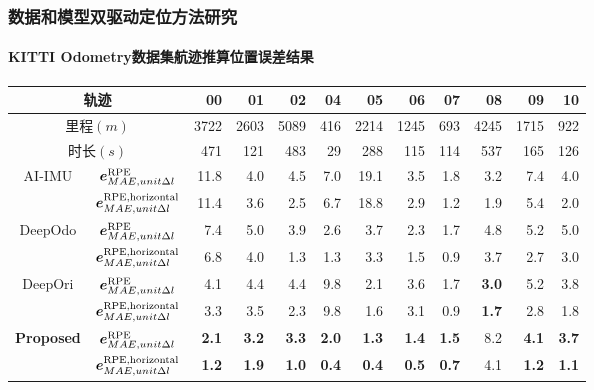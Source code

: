 \begin{frame} 
 	\frametitle{数据和模型双驱动定位方法研究}
 	\framesubtitle{KITTI Odometry数据集航迹推算位置误差结果}
    {\footnotesize
    \setlength{\tabcolsep}{2pt}
		\begin{tabular*}{\linewidth}{@{\extracolsep{\fill}}ccrrrrrrrrrr}
			\toprule
            \multicolumn{2}{c}{轨迹} & 00 & 01 & 02 & 04 & 05 & 06 & 07 & 08 & 09 & 10 \\
			\midrule
			\multicolumn{2}{c}{里程$\left(\unit{m}\right)$} & 3722 & 2603 & 5089 & 416 & 2214 & 1245 & 693 & 4245 & 1715 & 922 \\
			\multicolumn{2}{c}{时长$\left(\unit{s}\right)$} &  471 &  121 &  483 &  29 &  288 &  115 & 114 &  537 &  165 & 126 \\
			\multirow{2}{*}{AI-IMU}            & $\vb*{e}^{\mathrm{RPE}}_{MAE,unit \Delta l}$ & 11.8 & 4.0 & 4.5 & 7.0 & 19.1 & 3.5 & 1.8 & 3.2 & 7.4 & 4.0 \\
			                                   & $\vb*{e}^{\mathrm{RPE,horizontal}}_{MAE,unit \Delta l}$ & 11.4 & 3.6 & 2.5 & 6.7 & 18.8 & 2.9 & 1.2 & 1.9 & 5.4 & 2.0 \\
			\multirow{2}{*}{DeepOdo}           & $\vb*{e}^{\mathrm{RPE}}_{MAE,unit \Delta l}$ & 7.4 & 5.0 & 3.9 & 2.6 & 3.7 & 2.3 & 1.7 & 4.8 & 5.2 & 5.0 \\
			                                   & $\vb*{e}^{\mathrm{RPE,horizontal}}_{MAE,unit \Delta l}$ & 6.8 & 4.0 & 1.3 & 1.3 & 3.3 & 1.5 & 0.9 & 3.7 & 2.7 & 3.0 \\
			\multirow{2}{*}{DeepOri}           & $\vb*{e}^{\mathrm{RPE}}_{MAE,unit \Delta l}$ & 4.1 & 4.4 & 4.4 & 9.8 & 2.1 & 3.6 & 1.7 & \textbf{3.0} & 5.2 & 3.8 \\
			                                   & $\vb*{e}^{\mathrm{RPE,horizontal}}_{MAE,unit \Delta l}$ & 3.3 & 3.5 & 2.3 & 9.8 & 1.6 & 3.1 & 0.9 & \textbf{1.7} & 2.8 & 1.8 \\
			\multirow{2}{*}{\textbf{Proposed}} & $\vb*{e}^{\mathrm{RPE}}_{MAE,unit \Delta l}$ & \textbf{2.1} & \textbf{3.2} & \textbf{3.3} & \textbf{2.0} & \textbf{1.3} & \textbf{1.4} & \textbf{1.5} & 8.2 & \textbf{4.1} & \textbf{3.7} \\
			                                   & $\vb*{e}^{\mathrm{RPE,horizontal}}_{MAE,unit \Delta l}$ & \textbf{1.2} & \textbf{1.9} & \textbf{1.0} & \textbf{0.4} & \textbf{0.4} & \textbf{0.5} & \textbf{0.7} & 4.1 & \textbf{1.2} & \textbf{1.1} \\
			\bottomrule 
		\end{tabular*}
	}	
\end{frame}





